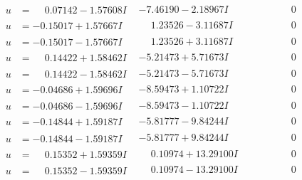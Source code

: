 \documentclass[1p]{elsarticle_modified}
\theoremstyle{definition}
\begin{document}
$$\begin{array}{c|c|c}
\begin{aligned}
u &= \phantom{-}0.07142 - 1.57608 I\end{aligned}
 & -7.46190 - 2.18967 I & \phantom{-0.000000 } 0 \\ \hline\begin{aligned}
u &= -0.15017 + 1.57667 I\end{aligned}
 & \phantom{-}1.23526 - 3.11687 I & \phantom{-0.000000 } 0 \\ \hline\begin{aligned}
u &= -0.15017 - 1.57667 I\end{aligned}
 & \phantom{-}1.23526 + 3.11687 I & \phantom{-0.000000 } 0 \\ \hline\begin{aligned}
u &= \phantom{-}0.14422 + 1.58462 I\end{aligned}
 & -5.21473 + 5.71673 I & \phantom{-0.000000 } 0 \\ \hline\begin{aligned}
u &= \phantom{-}0.14422 - 1.58462 I\end{aligned}
 & -5.21473 - 5.71673 I & \phantom{-0.000000 } 0 \\ \hline\begin{aligned}
u &= -0.04686 + 1.59696 I\end{aligned}
 & -8.59473 + 1.10722 I & \phantom{-0.000000 } 0 \\ \hline\begin{aligned}
u &= -0.04686 - 1.59696 I\end{aligned}
 & -8.59473 - 1.10722 I & \phantom{-0.000000 } 0 \\ \hline\begin{aligned}
u &= -0.14844 + 1.59187 I\end{aligned}
 & -5.81777 - 9.84244 I & \phantom{-0.000000 } 0 \\ \hline\begin{aligned}
u &= -0.14844 - 1.59187 I\end{aligned}
 & -5.81777 + 9.84244 I & \phantom{-0.000000 } 0 \\ \hline\begin{aligned}
u &= \phantom{-}0.15352 + 1.59359 I\end{aligned}
 & \phantom{-}0.10974 + 13.29100 I & \phantom{-0.000000 } 0 \\ \hline\begin{aligned}
u &= \phantom{-}0.15352 - 1.59359 I\end{aligned}
 & \phantom{-}0.10974 - 13.29100 I & \phantom{-0.000000 } 0 \\ \hline\begin{aligned}

\end{aligned}
\end{array}$$
\end{document}
